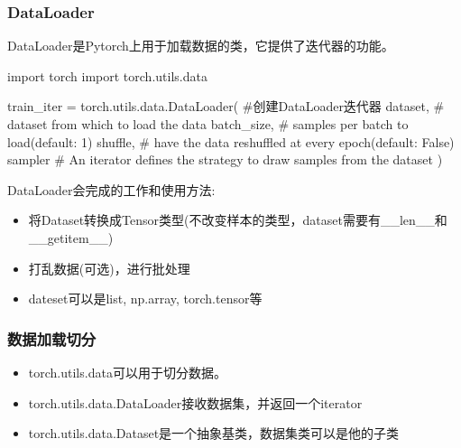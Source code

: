     \subsubsection{DataLoader}
      DataLoader是Pytorch上用于加载数据的类，它提供了迭代器的功能。
      \begin{codeblock}[language=python, caption={DataLoader}]
        import torch
        import torch.utils.data

        train_iter = torch.utils.data.DataLoader( #创建DataLoader迭代器
          dataset, # dataset from which to load the data
          batch_size, # samples per batch to load(default: 1)
          shuffle, # have the data reshuffled at every epoch(default: False)
          sampler # An iterator defines the strategy to draw samples from the dataset
        )
      \end{codeblock}

      DataLoader会完成的工作和使用方法:
      \begin{itemize}
        \item 将Dataset转换成Tensor类型(不改变样本的类型，dataset需要有\_\_len\_\_和\_\_getitem\_\_)
        \item 打乱数据(可选)，进行批处理
        \item dateset可以是list, np.array, torch.tensor等
      \end{itemize}

    \subsubsection{数据加载切分}
      \begin{itemize}
        \item torch.utils.data可以用于切分数据。
        \item torch.utils.data.DataLoader接收数据集，并返回一个iterator
        \item torch.utils.data.Dataset是一个抽象基类，数据集类可以是他的子类
      \end{itemize}

